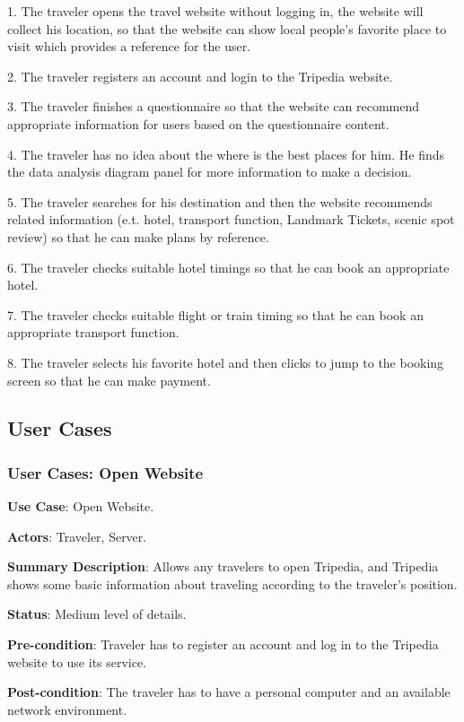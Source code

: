 \documentclass[conference]{IEEEtran}
\begin{document}
1. The traveler opens the travel website without logging in, the website will collect his location, so that the website can show local people's favorite place to visit which provides a reference for the user.

2. The traveler registers an account and login to the Tripedia website.

3. The traveler finishes a questionnaire so that the website can recommend appropriate information for users based on the questionnaire content.

4. The traveler has no idea about the where is the best places for him. He finds the data analysis diagram panel for more information to make a decision.

5. The traveler searches for his destination and then the website recommends related information (e.t. hotel, transport function, Landmark Tickets, scenic spot review) so that he can make plans by reference.

6. The traveler checks suitable hotel timings so that he can book an appropriate hotel.

7. The traveler checks suitable flight or train timing so that he can book an appropriate transport function.

8. The traveler selects his favorite hotel and then clicks to jump to the booking screen so that he can make payment.



\subsection{User Cases}


\subsubsection{User Cases: Open Website}

\textbf{ }

\textbf{Use Case}: Open Website.

\textbf{Actors}: Traveler, Server.

\textbf{Summary Description}: Allows any travelers to open Tripedia, and Tripedia shows some basic information about traveling according to the traveler's position.
 
\textbf{Status}: Medium level of details.

\textbf{Pre-condition}: Traveler has to register an account and log in to the Tripedia website to use its service.

\textbf{Post-condition}: The traveler has to have a personal computer and an available network environment.
\end{document}
